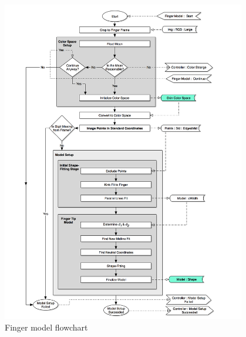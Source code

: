 \begin{figure}[h!]
  \centering
    \includegraphics[width=0.95\textwidth]{Chapter4/Figs/Fingerpress_Finger_Model.jpg}
    \caption{Finger model flowchart}\label{fig:FingerpressFingerModel}
\end{figure}

